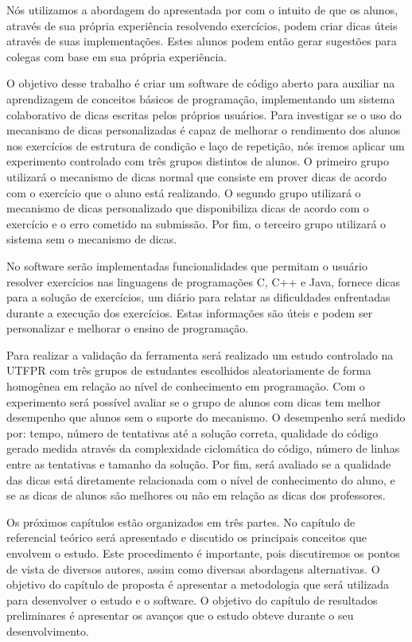Nós utilizamos a abordagem do  apresentada por  com o intuito de que os alunos, através de sua própria experiência resolvendo exercícios, podem criar dicas úteis através de suas implementações. Estes alunos podem então gerar sugestões para colegas com base em sua própria experiência.

O objetivo desse trabalho é criar um software de código aberto para auxiliar na aprendizagem de conceitos básicos de programação, implementando um sistema colaborativo de dicas escritas pelos próprios usuários. Para investigar se o uso do mecanismo de dicas personalizadas é capaz de melhorar o rendimento dos alunos nos exercícios de estrutura de condição e laço de repetição, nós iremos aplicar um experimento controlado com três grupos distintos de alunos. O primeiro grupo utilizará o mecanismo de dicas normal que consiste em prover dicas de acordo com o exercício que o aluno está realizando. O segundo grupo utilizará o mecanismo de dicas personalizado que disponibiliza dicas de acordo com o exercício e o erro cometido na submissão. Por fim, o terceiro grupo utilizará o sistema sem o mecanismo de dicas.

No software serão implementadas funcionalidades que permitam o usuário resolver exercícios nas linguagens de programações C, C++ e Java, fornece dicas para a solução de exercícios, um diário para relatar as dificuldades enfrentadas durante a execução dos exercícios. Estas informações são úteis e podem ser personalizar e melhorar o ensino de programação.

Para realizar a validação da ferramenta será realizado um estudo controlado na UTFPR com três grupos de estudantes escolhidos aleatoriamente de forma homogênea em relação ao nível de conhecimento em programação. Com o experimento será possível avaliar se o grupo de alunos com dicas tem melhor desempenho que alunos sem o suporte do mecanismo. O desempenho será medido por: tempo, número de tentativas até a solução correta, qualidade do código gerado medida através da complexidade ciclomática do código, número de linhas entre as tentativas e tamanho da solução. Por fim, será avaliado se a qualidade das dicas está diretamente relacionada com o nível de conhecimento do aluno, e se as dicas de alunos são melhores ou não em relação as dicas dos professores.

Os próximos capítulos estão organizados em três partes. No capítulo de referencial teórico será apresentado e discutido os principais conceitos que envolvem o estudo. Este procedimento é importante, pois discutiremos os pontos de vista de diversos autores, assim como diversas abordagens alternativas. O objetivo do capítulo de proposta é apresentar a metodologia que será utilizada para desenvolver o estudo e o software. O objetivo do capítulo de resultados preliminares é apresentar os avanços que o estudo obteve durante o seu desenvolvimento.